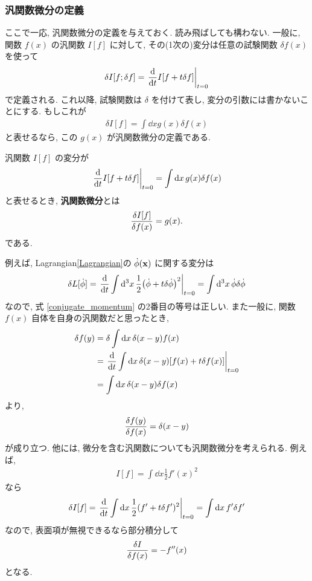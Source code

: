 \documentclass[../note01.tex]{subfiles}
\begin{document}
\subsubsection{汎関数微分の定義}
ここで一応, 汎関数微分の定義を与えておく. 読み飛ばしても構わない.
一般に, 関数 $ f(x) $ の汎関数 $ I[f] $ に対して, その(1次の)変分は任意の試験関数 $ \delta f(x) $ を使って
\begin{align}
    \delta I[f;\delta f] = \left.\dv{t}I[f+t\delta f]\right|_{t=0}
\end{align}
で定義される. これ以降, 試験関数は $ \delta $ を付けて表し, 変分の引数には書かないことにする. もしこれが
\begin{align}
    \delta I[f] = \int\dd{x} g(x)\delta f(x)
\end{align}
と表せるなら, この $ g(x) $ が汎関数微分の定義である.
\begin{katei}
    汎関数 $ I[f] $ の変分が
    \begin{align}
        \left.\dv{t}I[f+t\delta f]\right|_{t=0} = \int\dd{x} g(x)\delta f(x)
    \end{align}
    と表せるとき, \textbf{汎関数微分}とは
    \begin{align}
        \fdv{I[f]}{f(x)} = g(x).
    \end{align}
    である.
\end{katei}
\noindent 例えば, Lagrangian\eqref{Lagrangian}の $ \dot{\phi}(\vb{x}) $ に関する変分は
\begin{align*}
    \delta L[\dot{\phi}] = \left.\dv{t} \int\dd[3]{x} \frac{1}{2}\qty(\dot{\phi}+t\delta\dot{\phi})^2\right|_{t=0}
    = \int\dd[3]{x} \dot{\phi}\delta\dot{\phi}
\end{align*}
なので, 式 \eqref{conjugate_momentum} の2番目の等号は正しい. また一般に, 関数 $ f(x) $ 自体を自身の汎関数だと思ったとき,
\begin{align*}
    \delta f(y) &= \delta \int\dd{x} \delta(x-y)f(x) \\
    &= \left.\dv{t} \int\dd{x} \delta(x-y) \qty[f(x)+t\delta f(x)]\right|_{t=0} \\
    &= \int\dd{x} \delta(x-y)\delta f(x)
\end{align*}
より,
\begin{align}
    \fdv{f(y)}{f(x)} = \delta(x-y)
\end{align}
が成り立つ. 他には, 微分を含む汎関数についても汎関数微分を考えられる. 例えば,
\begin{align}
    I[f] = \int\dd{x} \frac{1}{2}f'(x)^2
\end{align}
なら
\begin{align*}
    \delta I[f] = \left.\dv{t} \int\dd{x} \frac{1}{2} (f'+t\delta f')^2 \right|_{t=0}
    = \int\dd{x} f'\delta f'
\end{align*}
なので, 表面項が無視できるなら部分積分して
\begin{align}
    \fdv{I}{f(x)} = -f''(x)
\end{align}
となる.
\end{document}
